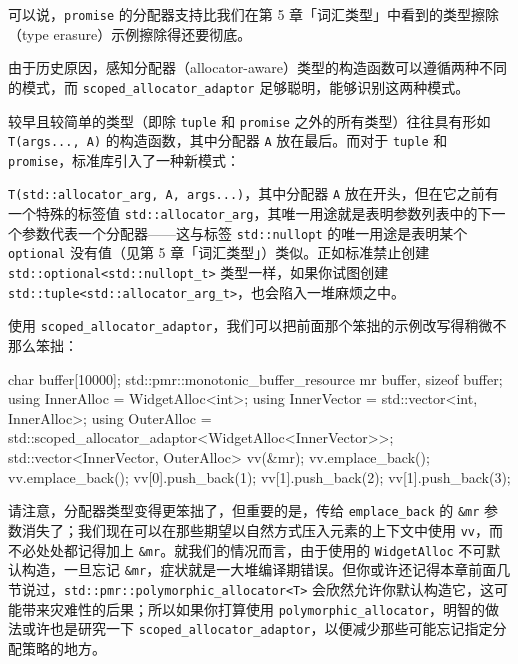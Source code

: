 可以说，\texttt{promise} 的分配器支持比我们在第 5 章「词汇类型」中看到的类型擦除（type erasure）示例擦除得还要彻底。

由于历史原因，感知分配器（allocator-aware）类型的构造函数可以遵循两种不同的模式，而 \texttt{scoped\_\allowbreak{}allocator\_\allowbreak{}adaptor} 足够聪明，能够识别这两种模式。

较早且较简单的类型（即除 \texttt{tuple} 和 \texttt{promise} 之外的所有类型）往往具有形如 \texttt{T(\allowbreak{}args...,\allowbreak{} A)\allowbreak{}} 的构造函数，其中分配器 \texttt{A} 放在最后。而对于 \texttt{tuple} 和 \texttt{promise}，标准库引入了一种新模式：

\texttt{T(\allowbreak{}std::\allowbreak{}allocator\_\allowbreak{}arg,\allowbreak{} A,\allowbreak{} args...)\allowbreak{}}，其中分配器 \texttt{A} 放在开头，但在它之前有一个特殊的标签值 \texttt{std::\allowbreak{}allocator\_\allowbreak{}arg}，其唯一用途就是表明参数列表中的下一个参数代表一个分配器——这与标签 \texttt{std::\allowbreak{}nullopt} 的唯一用途是表明某个 \texttt{optional} 没有值（见第 5 章「词汇类型」）类似。正如标准禁止创建 \texttt{std::\allowbreak{}optional<\allowbreak{}std::\allowbreak{}nullopt\_\allowbreak{}t>\allowbreak{}} 类型一样，如果你试图创建 \texttt{std::\allowbreak{}tuple<\allowbreak{}std::\allowbreak{}allocator\_\allowbreak{}arg\_\allowbreak{}t>\allowbreak{}}，也会陷入一堆麻烦之中。

使用 \texttt{scoped\_\allowbreak{}allocator\_\allowbreak{}adaptor}，我们可以把前面那个笨拙的示例改写得稍微不那么笨拙：

\begin{codebox}[cpp]
    char buffer[10000];
    std::pmr::monotonic_buffer_resource mr {buffer, sizeof buffer};
    using InnerAlloc = WidgetAlloc<int>;
    using InnerVector = std::vector<int, InnerAlloc>;
    using OuterAlloc =
    std::scoped_allocator_adaptor<WidgetAlloc<InnerVector>>;
    std::vector<InnerVector, OuterAlloc> vv(&mr);
    vv.emplace_back();
    vv.emplace_back();
    vv[0].push_back(1);
    vv[1].push_back(2);
    vv[1].push_back(3);
\end{codebox}

请注意，分配器类型变得更笨拙了，但重要的是，传给 \texttt{emplace\_\allowbreak{}back} 的 \texttt{\&mr} 参数消失了；我们现在可以在那些期望以自然方式压入元素的上下文中使用 \texttt{vv}，而不必处处都记得加上 \texttt{\&mr}。就我们的情况而言，由于使用的 \texttt{Widget\allowbreak{}Alloc} 不可默认构造，一旦忘记 \texttt{\&mr}，症状就是一大堆编译期错误。但你或许还记得本章前面几节说过，\texttt{std::\allowbreak{}pmr::\allowbreak{}polymorphic\_\allowbreak{}allocator<\allowbreak{}T>\allowbreak{}} 会欣然允许你默认构造它，这可能带来灾难性的后果；所以如果你打算使用 \texttt{polymorphic\_\allowbreak{}allocator}，明智的做法或许也是研究一下 \texttt{scoped\_\allowbreak{}allocator\_\allowbreak{}adaptor}，以便减少那些可能忘记指定分配策略的地方。

